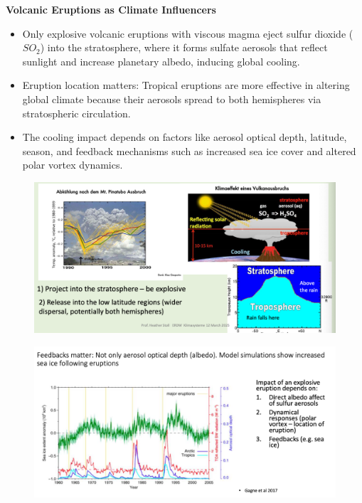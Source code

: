 \documentclass[fontsize=8pt, a4paper, landscape, fleqn]{scrartcl}
\renewcommand{\subsection}[1]{%
    \noindent\colorbox{subsectioncolor}{%
        \parbox{\dimexpr\columnwidth-2\fboxsep}{\color{white}\textbf{#1}}}%
    \vspace{0.5mm}%
}
\begin{document}
\begin{multicols*}{3}[\raggedcolumns]
\subsection{Volcanic Eruptions as Climate Influencers}
\begin{itemize}
\item Only explosive volcanic eruptions with viscous magma eject sulfur dioxide ($SO_2$) into the stratosphere, where it forms sulfate aerosols that reflect sunlight and increase planetary albedo, inducing global cooling.
\item Eruption location matters: Tropical eruptions are more effective in altering global climate because their aerosols spread to both hemispheres via stratospheric circulation.
\item The cooling impact depends on factors like aerosol optical depth, latitude, season, and feedback mechanisms such as increased sea ice cover and altered polar vortex dynamics.
\end{itemize}

\begin{figure}[H]
    \centering
    \includegraphics[width=1\linewidth]{CS//img/Vulcano_impact.png}
\end{figure}


\begin{figure}[H]
    \centering
    \includegraphics[width=1\linewidth]{CS//img/Vulcano_feedback.png}
\end{figure}

\end{multicols*}
\end{document}
